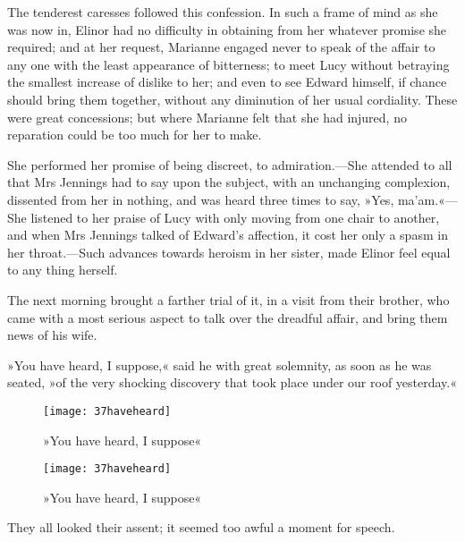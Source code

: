 The tenderest caresses followed this confession. In such a frame of mind as she was now in, Elinor had no difficulty in obtaining from her whatever promise she required; and at her request, Marianne engaged never to speak of the affair to any one with the least appearance of bitterness; to meet Lucy without betraying the smallest increase of dislike to her; and even to see Edward himself, if chance should bring them together, without any diminution of her usual cordiality. These were great concessions; but where Marianne felt that she had injured, no reparation could be too much for her to make.

She performed her promise of being discreet, to admiration.—She attended to all that Mrs Jennings had to say upon the subject, with an unchanging complexion, dissented from her in nothing, and was heard three times to say, »Yes, ma’am.«—She listened to her praise of Lucy with only moving from one chair to another, and when Mrs Jennings talked of Edward’s affection, it cost her only a spasm in her throat.—Such advances towards heroism in her sister, made Elinor feel equal to any thing herself.

The next morning brought a farther trial of it, in a visit from their brother, who came with a most serious aspect to talk over the dreadful affair, and bring them news of his wife.

»You have heard, I suppose,« said he with great solemnity, as soon as he was seated, »of the very shocking discovery that took place under our roof yesterday.«

\begin{a4}
	\begin{figure}[tbph]
		\centering
		\texttt{[image: 37haveheard]}
		\caption{»You have heard, I suppose«}
	\end{figure}
\end{a4}

\begin{letter}
	\begin{figure}[tbph]
		\centering
		\texttt{[image: 37haveheard]}
		\caption{»You have heard, I suppose«}
	\end{figure}
\end{letter}

They all looked their assent; it seemed too awful a moment for speech.

